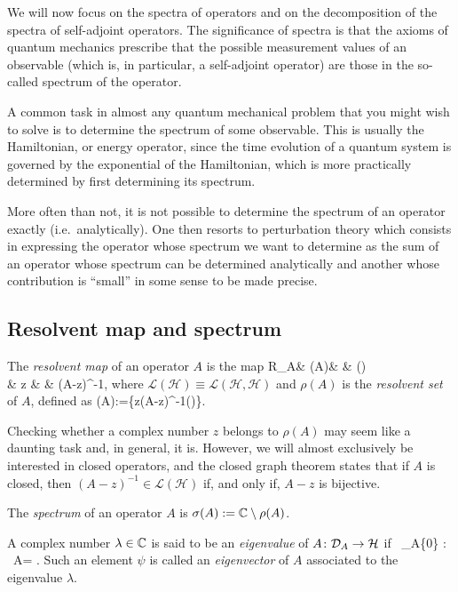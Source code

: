 


We will now focus on the spectra of operators and on the decomposition of the spectra of self-adjoint operators. The significance of spectra is that the axioms of quantum mechanics prescribe that the possible measurement values of an observable (which is, in particular, a self-adjoint operator) are those in the so-called spectrum of the operator.

A common task in almost any quantum mechanical problem that you might wish to solve is to determine the spectrum of some observable. This is usually the Hamiltonian, or energy operator, since the time evolution of a quantum system is governed by the exponential of the Hamiltonian, which is more practically determined by first determining its spectrum.

More often than not, it is not possible to determine the spectrum of an operator exactly (i.e.\ analytically). One then resorts to perturbation theory which consists in expressing the operator whose spectrum we want to determine as the sum of an operator whose spectrum can be determined analytically and another whose contribution is ``small'' in some sense to be made precise.



\subsection{Resolvent map and spectrum}

\bd
The \emph{resolvent map} of an operator $A$ is the map
R_A\cl & \rho(A)& \to & ()\\
& z & \mapsto & (A-z)^{-1},
\ei
where $\mathcal{L}(\mathcal{H})\equiv \mathcal{L}(\mathcal{H},\mathcal{H})$ and $\rho(A)$ is the \emph{resolvent set} of $A$, defined as
\bse
\rho(A):=\{z\in\C \mid (A-z)^{-1}\in {}()\}.
\ese
\ed

\br
Checking whether a complex number $z$ belongs to $\rho(A)$ may seem like a daunting task and, in general, it is. However, we will almost exclusively be interested in closed operators, and the closed graph theorem states that if $A$ is closed, then $(A-z)^{-1}\in \mathcal{L}(\mathcal{H})$ if, and only if, $A-z$ is bijective.
\er

\bd
The \emph{spectrum} of an operator $A$ is $\sigma(A):=\mathbb{C}\setminus\rho(A)$.
\ed

\bd
A complex number $\lambda\in\mathbb{C}$ is said to be an \emph{eigenvalue} of $A\colon\mathcal{D}_A\to\mathcal{H}$ if
\bse
\exists\, \psi \in {}_A\setminus \{0\} : \ A\psi = \lambda \psi.
\ese
Such an element $\psi$ is called an \emph{eigenvector} of $A$ associated to the eigenvalue $\lambda$.
\ed

